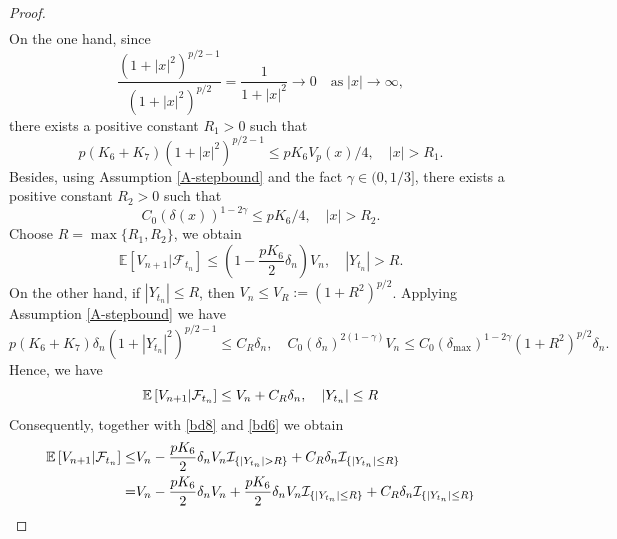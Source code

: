 \documentclass[preprint,12pt,compress]{elsarticle}
\begin{document}
\begin{proof}
\begin{equation}
\begin{split}
\end{split}
\end{equation}
On the one hand, since
\begin{equation*}
	\frac{{{{(1 + |x|^2)}^{p/2 - 1}}}}{{{{(1 +  |x|^2)}^{p/2}}}} = \frac{1}{{1 +  |x|^2}} \to 0 \quad \text{as} \; |x|\to \infty,
\end{equation*}
there exists a positive constant $R_1 > 0$ such that 
\begin{equation*}
	p({K_6} + {K_7}){\left( {1 + {{\left| x \right|}^2}} \right)^{p/2 - 1}} \le {pK_6}V_p(x)/4, \quad |x| > R_1.
\end{equation*}
Besides, using Assumption \ref{A-stepbound} and the fact $\gamma \in (0, 1/3]$, there exists a positive constant $R_2 > 0$ such that
\begin{equation*}
	C_0{(\delta (x))^{1 - 2\gamma }} \le {p{K_6}}/{4}, \quad |x| > R_2.
\end{equation*}
Choose $R = \max\{R_1, R_2\}$, we obtain
\begin{equation} \label{bd8}
	\mathbb{E}\left[ {{V_{n + 1}}|{\mathcal{F}_{{t_n}}}} \right] \le \left( {1 - \frac{{p{K_6}}}{2}{\delta _n}} \right){V_n}, \quad |Y_{t_n}| > R.
\end{equation}
On the other hand, if $|Y_{t_n}| \le R$, then $V_n
\le V_R := (1+R^2)^{p/2}$. Applying Assumption \ref{A-stepbound} we have
\begin{equation*}
	p({K_6} + {K_7}){\delta _n}{\left( {1 + {{\left| {{Y_{{t_n}}}} \right|}^2}} \right)^{p/2 - 1}} \le {C_R}{\delta _n}, \quad C_0{\left( {{\delta _n}} \right)^{2(1 - \gamma )}}V_n \le C_0{\left( {{\delta _{\max }}} \right)^{1 - 2\gamma }}{(1 + {R^2})^{p/2}}{\delta _n}. 
\end{equation*}
Hence, we have
\begin{equation}  \label{bd6}
	\mathbb{E}\left[ {{V_{n + 1}}|{{\cal F}_{{t_n}}}} \right] \le {V_n} + {C_R}{\delta _n}, \quad |Y_{t_n}| \le R
\end{equation}
Consequently, together with \eqref{bd8} and \eqref{bd6} we obtain
\begin{equation}  \label{bd9}
\begin{split}
	\mathbb{E}\left[ {V_{n+1}|{{\cal F}_{{t_n}}}} \right] \le& V_n - \frac{{p{K_6}}}{2}{\delta _n}V_n{\mathcal{I}_{\{ |{Y_{{t_n}}}| > R\} }} + {C_R}{\delta _n}{\mathcal{I}_{\{ |{Y_{{t_n}}}| \le R\} }} \\
	=& V_n - \frac{{p{K_6}}}{2}{\delta _n}V_n + \frac{{p{K_6}}}{2}{\delta _n}V_n{\mathcal{I}_{\{ |{Y_{{t_n}}}| \le R\} }} + {C_R}{\delta _n}{\mathcal{I}_{\{ |{Y_{{t_n}}}| \le R\} }} \\

\end{split}
\end{equation}
\end{proof}
\end{document}
